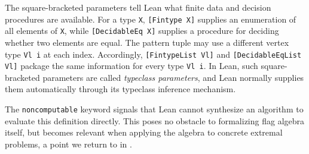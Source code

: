 \documentclass{article}
\newcommand{\lean}[1]{\texttt{#1}}
\begin{document}
The square-bracketed parameters tell Lean what finite data and decision
procedures are available.  For a type \lean{X}, \lean{[Fintype X]} supplies an
enumeration of all elements of \lean{X}, while \lean{[DecidableEq X]} supplies
a procedure for deciding whether two elements are equal.  The pattern tuple
may use a different vertex type \lean{Vl i} at each index.  Accordingly,
\lean{[FintypeList Vl]} and \lean{[DecidableEqList Vl]} package the same
information for every type \lean{Vl i}.  In Lean, such square-bracketed
parameters are called \emph{typeclass parameters}, and Lean normally supplies
them automatically through its typeclass inference mechanism.

The \lean{noncomputable} keyword signals that Lean cannot synthesize an
algorithm to evaluate this definition directly.  This poses no obstacle to
formalizing flag algebra itself, but becomes relevant when applying the algebra
to concrete extremal problems, a point we return to in .
\end{document}
